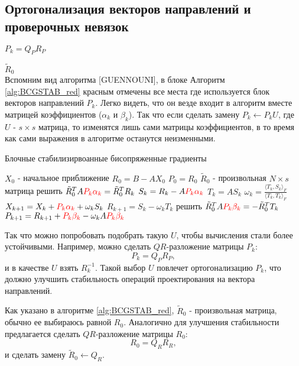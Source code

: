 \subsection{Ортогонализация векторов направлений и проверочных невязок}

$P_k = Q_PR_P$\\
\par $\tilde{R}_0$\\
Вспомним вид алгоритма [GUENNOUNI], в блоке Алгоритм \ref{alg:BCGSTAB_red} красным отмечены
все места где используется блок векторов направлений $P_k$. Легко видеть, что он везде
входит в алгоритм вместе матрицей коэффициентов ($\alpha_k$ и $\beta_k$). Так что если сделать замену
$P_k \gets P_k U$, где $U$ - $s \times s$ матрица, то изменятся лишь сами матрицы коэффициентов,
в то время как сами выражения в алгоритме останутся неизменными.       
\begin{algorithm}
    \caption{Блочные стабилизирвоанные бисопряженные градиенты}\label{alg:BCGSTAB_red}
    \begin{algorithmic}
    \State $X_0$ - начальное приближение
    \State $R_0 = B - AX_0$
    \State $P_0 = R_0$
    \State $\tilde{R}_0$ - произвольная $N \times s$ матрица
        \State решить $\tilde{R}_0^TA {\color{red}P_k\alpha_k} = \tilde{R}_0^TR_k$
        \State $S_k=R_k-A{\color{red}P_k\alpha_k}$
        \State $T_k=AS_k$
        \State $\omega_k = \frac{\langle T_k,S_k\rangle_F}{\langle T_k, T_k\rangle_F}$
        \State $X_{k+1}=X_k + {\color{red}P_k\alpha_k} + \omega_kS_k$
        \State $R_{k+1} = S_k - \omega_k T_k$
        \State решить $\tilde{R}_0^TA{\color{red}P_k\beta_k} = -\tilde{R}_0^TT_k$
        \State $P_{k+1}=R_{k+1} + {\color{red}P_k\beta_k} - \omega_k A{\color{red}P_k\beta_k}$
    \EndFor  
    \end{algorithmic}
\end{algorithm}
Так что можно попробовать подобрать такую $U$, чтобы вычисления стали более устойчивыми. Например, можно 
сделать $QR$-разложение матрицы $P_k$:
$$P_k = Q_PR_P,$$
и в качестве $U$ взять $R_k^{-1}$. Такой выбор $U$ повлечет ортогонализацию $P_k$, что должно улучшить стабильность
операций проектирования на вектора направлений.
\par Как указано в алгоритме \ref{alg:BCGSTAB_red}, $\tilde{R}_0$ - произвольная матрица, обычно ее выбираюсь равной
$R_0$. Аналогично для улучшения стабильности предлагается сделать $QR$-разложение матрицы
$R_0$:
$$R_0 = Q_R R_R,$$
и сделать замену $\tilde{R}_0 \gets Q_R$.

